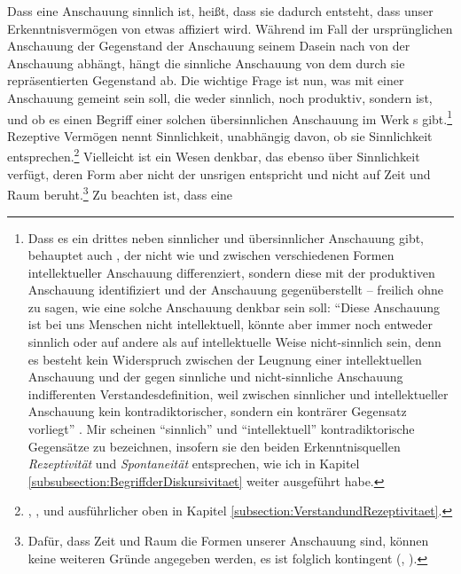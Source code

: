 Dass eine Anschauung sinnlich ist, heißt, dass sie dadurch entsteht, dass
unser Erkenntnisvermögen von etwas affiziert wird. Während im Fall der
ursprünglichen Anschauung der Gegenstand der Anschauung seinem Dasein nach von
der Anschauung abhängt, hängt die sinnliche Anschauung von dem durch sie
repräsentierten Gegenstand ab. Die wichtige Frage ist nun, was mit einer
Anschauung gemeint sein soll, die weder sinnlich, noch produktiv, sondern
 ist, und ob es einen Begriff einer solchen
übersinnlichen Anschauung im Werk s
gibt.\footnote{Dass es ein drittes neben sinnlicher und übersinnlicher
  Anschauung gibt, behauptet auch
  , 
der nicht wie  und
 zwischen verschiedenen Formen
intellektueller Anschauung differenziert, sondern diese mit der produktiven
Anschauung identifiziert und der  Anschauung
gegenüberstellt -- freilich ohne zu sagen, wie eine solche Anschauung denkbar
sein soll: \enquote{Diese Anschauung ist bei uns Menschen nicht intellektuell,
könnte aber immer noch entweder sinnlich oder auf andere als auf intellektuelle
Weise nicht-sinnlich sein, denn es besteht kein Widerspruch zwischen der Leugnung
einer intellektuellen Anschauung und der gegen sinnliche und nicht-sinnliche
Anschauung indifferenten Verstandesdefinition, weil zwischen sinnlicher und
intellektueller Anschauung kein kontradiktorischer, sondern ein konträrer
Gegensatz vorliegt}
\parencite[][83--85]{Baum:DeduktionundBeweisinKantsTranszendentalphilosophie1986}.
Mir scheinen \enquote{sinnlich} und \enquote{intellektuell} kontradiktorische
Gegensätze zu bezeichnen, insofern sie den beiden Erkenntnisquellen
\emph{Rezeptivität} und \emph{Spontaneität} entsprechen, wie ich in Kapitel
\ref{subsubsection:BegriffderDiskursivitaet} weiter ausgeführt habe.} 
Rezeptive Vermögen nennt  Sinnlichkeit, unabhängig davon,
ob sie  Sinnlichkeit
entsprechen.\footnote{\cite[Vgl.][B 75]{Kant:KritikderreinenVernunft2003},
\cite[][III: 75.5--7]{Kant:GesammelteWerke1900ff.}, und ausführlicher oben in
Kapitel \ref{subsection:VerstandundRezeptivitaet}.} Vielleicht ist ein Wesen denkbar,
das ebenso über Sinnlichkeit verfügt, deren Form aber nicht der unsrigen
entspricht und nicht auf Zeit und Raum beruht.\footnote{Dafür, dass Zeit und
Raum die Formen unserer Anschauung sind, können keine weiteren Gründe angegeben
werden, es ist folglich kontingent
\mkbibparens{\cite[vgl.][\S~21]{Kant:KritikderreinenVernunft2003}, \cite[][III:
116.23--29]{Kant:GesammelteWerke1900ff.}}.} Zu beachten ist, dass eine
